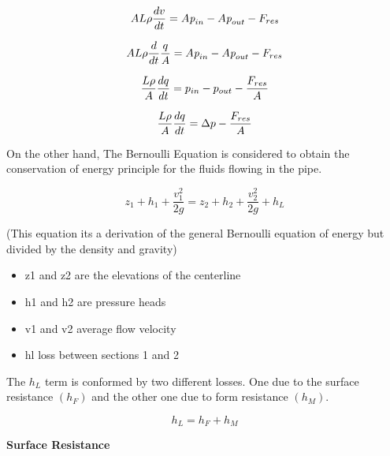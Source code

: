 \begin{equation}
    A L \rho \frac{dv}{dt} = A \textit{p}_{in} - A \textit{p}_{out} - F_{res} \\
\end{equation}

\begin{equation}
    A L \rho \frac{d}{dt} \frac{q}{A} = A \textit{p}_{in} - A \textit{p}_{out} - F_{res} \\
\end{equation}

\begin{equation}
    \frac{L \rho}{A} \frac{dq}{dt} =p_{in} - p_{out} - \frac{ F_{res}}{A} \\
\end{equation}

\begin{equation}
    \frac{L \rho}{A} \frac{dq}{dt} =\Delta p - \frac{ F_{res}}{A} \\
\end{equation}


On the other hand, The Bernoulli Equation is considered to obtain the conservation of energy principle for the fluids flowing in the pipe.

\begin{equation}
  \label{Bernoulliequation}
z_1 + h_1 + \frac{v_1^{2}}{2g} = z_2 + h_2 + \frac{v_2^{2}}{2g} + h_L
\end{equation}

(This equation its a derivation of the general Bernoulli equation of energy but divided by the density and 
gravity)\\

\begin{itemize}
  \item   z1 and z2 are the elevations of the centerline
  \item   h1 and h2 are pressure heads
  \item   v1 and v2 average flow velocity
  \item   hl loss between sections 1 and 2
\end{itemize}

The $h_L$ term is conformed by two different losses. One due to the surface resistance $(h_F)$ and the other one due to form resistance $(h_M)$. 

\begin{equation}
  h_L = h_F + h_M
\end{equation}

\textbf{Surface Resistance} \\ 

